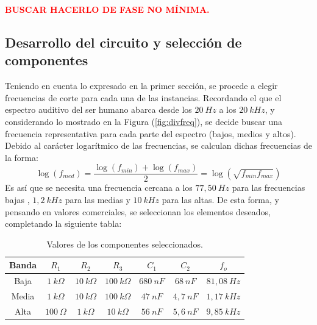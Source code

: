 \documentclass[a4paper]{article}
\begin{document}
\begin{center}
\textcolor{red}{\textbf{BUSCAR HACERLO DE FASE NO MÍNIMA.}}
\end{center}

\subsection{Desarrollo del circuito y selección de componentes}

Teniendo en cuenta lo expresado en la primer sección, se procede a elegir frecuencias de corte para cada una de las instancias. Recordando el que el espectro auditivo del ser humano abarca desde los $20 \ Hz$ a los $20 \ kHz$, y considerando lo mostrado en la Figura (\ref{fig:divfreq}), se decide buscar una frecuencia representativa para cada parte del espectro (bajos, medios y altos). Debido al carácter logarítmico de las frecuencias, se calculan dichas frecuencias de la forma:
\begin{equation*}
	\log{(f_{med})} = \frac{\log(f_{min}) + \log(f_{max})}{2} = \log(\sqrt{f_{min} f_{max}})
\end{equation*}
 Es así que se necesita una frecuencia cercana a los $77,50 \ Hz$ para las frecuencias bajas , $1,2 \ kHz$ para las medias y $10 \ kHz$ para las altas. De esta forma, y pensando en valores comerciales, se seleccionan los elementos deseados, completando la siguiente tabla:

\begin{table}[H]
\begin{center}
\begin{tabular}{ccccccc}
\hline
Banda & $R_1$ & $R_2$ & $R_3$ & $C_1$ & $C_2$ & $f_o$ \\
\hline
Baja & $1 \ k\Omega$ & $10 \ k\Omega$ & $100 \ k\Omega$ & $680 \ nF$ & $68 \ nF$ & $81,08 \ Hz$ \\
Media & $1 \ k\Omega$ & $10 \ k\Omega$ & $100 \ k\Omega$ & $47 \ nF$ & $4,7 \ nF$ & $1,17 \ kHz$ \\
Alta & $100 \ \Omega$ & $1 \ k\Omega$ & $10 \ k\Omega$ & $56 \ nF$ & $5,6 \ nF$ & $9,85 \ kHz$\\
\hline
\end{tabular}
\caption{Valores de los componentes seleccionados.}
\label{tabla:valores}
\end{center}
\end{table}
\end{document}
